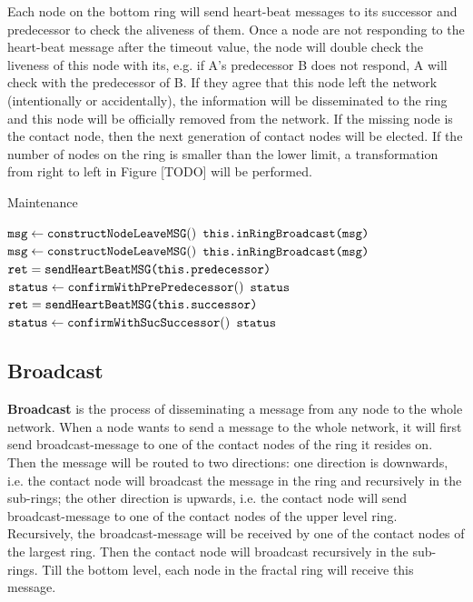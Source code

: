 Each node on the bottom ring will send heart-beat messages to its successor and predecessor to check the aliveness of them. Once a node are not responding to the heart-beat message after the timeout value, the node will double check the liveness of this node with its, e.g. if A's predecessor B does not respond, A will check with the predecessor of B. If they agree that this node left the network (intentionally or accidentally), the information will be disseminated to the ring and this node will be officially removed from the network. If the missing node is the contact node, then the next generation of contact nodes will be elected. If the number of nodes on the ring is smaller than the lower limit, a transformation from right to left in Figure [TODO] will be performed.

\begin{algorithm}
	\caption{Maintenance}\label{euclid}
	\begin{algorithmic}[1]
		\State $\texttt{msg} \gets \texttt{constructNodeLeaveMSG}()$
		\State $\texttt{this.inRingBroadcast(msg)}$
		\EndIf
		\State $\texttt{msg} \gets \texttt{constructNodeLeaveMSG}()$
		\State $\texttt{this.inRingBroadcast(msg)}$
		\EndIf
		\EndFunction
		\\
		\State $\texttt{ret} = \texttt{sendHeartBeatMSG(this.predecessor)}$
		\State $\texttt{status} \gets \texttt{confirmWithPrePredecessor}()$
		\State \Return $\texttt{status}$
		\EndIf
		\EndFunction
		\\
		\State $\texttt{ret} = \texttt{sendHeartBeatMSG(this.successor)}$
		\State $\texttt{status} \gets \texttt{confirmWithSucSuccessor}()$
		\State \Return $\texttt{status}$
		\EndIf
		\EndFunction
	\end{algorithmic}
\end{algorithm}

\subsection{Broadcast} \label{broadcast}

\textbf{Broadcast} is the process of disseminating a message from any node to the whole network. When a node wants to send a message to the whole network, it will first send broadcast-message to one of the contact nodes of the ring it resides on. Then the message will be routed to two directions: one direction is downwards, i.e. the contact node will broadcast the message in the ring and recursively in the sub-rings; the other direction is upwards, i.e. the contact node will send broadcast-message to one of the contact nodes of the upper level ring. Recursively, the broadcast-message will be received by one of the contact nodes of the largest ring. Then the contact node will broadcast recursively in the sub-rings. Till the bottom level, each node in the fractal ring will receive this message.

